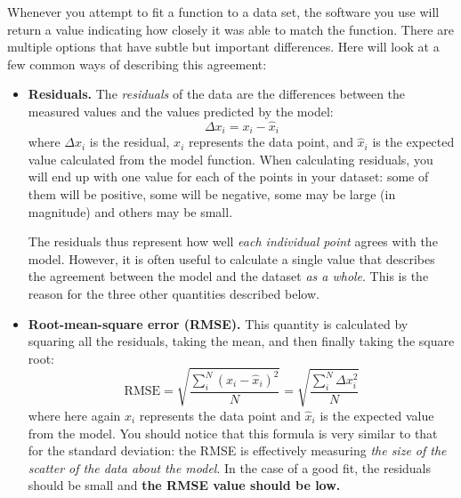 \documentclass[11pt]{article}
\begin{document}
Whenever you attempt to fit a function to a data set, the software you use will
return a value indicating how closely it was able to match the function. There
are multiple options that have subtle but important differences. Here will look
at a few common ways of describing this agreement:
\begin{itemize}
\item {\bf Residuals.} The \textit{residuals} of the data are the differences between the
 measured values and the values predicted by the model:
 \begin{equation}
  \Delta x_i = x_i-\hat{x}_i
\end{equation}
where $\Delta x_i$ is the residual, $x_i$ represents the data point, and $\hat{x}_i$ is the expected value
calculated from the model function. %
When calculating residuals, you will end up with one value 
for each of the points in your dataset: some of them will be positive, some will be negative, 
some may be large (in magnitude) and others may be small. 

The residuals thus represent how well \textit{each individual 
point} agrees with the model. However, it is often useful to calculate a single value that describes
the agreement between the model and the dataset \textit{as a whole}. This is the reason for the
three other quantities described below.

\item {\bf Root-mean-square error (RMSE).} This quantity is calculated by squaring all the
 residuals, taking the mean, and then finally taking the square root:
\begin{equation}
  \textrm{RMSE} = \sqrt{\frac{\sum_i^N (x_i-\hat{x}_i)^2}{N}}= \sqrt{\frac{\sum_i^N \Delta x_i^2}{N}}
\end{equation}
where here again $x_i$ represents the data point and $\hat{x}_i$ is the expected value
from the model. You should notice that this formula is very similar to that for the standard deviation: the RMSE is effectively measuring \textit{the size of the scatter of the data about the model}. In the case of a good fit, the residuals should be small and 
\textbf{the RMSE value should be low.} %


\end{itemize}
\end{document}
